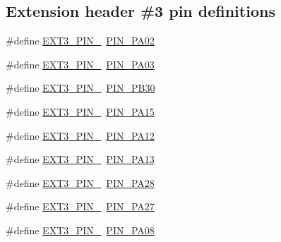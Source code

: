 \subsection*{Extension header \#3 pin definitions}
\begin{DoxyCompactItemize}
\item 
\#define \mbox{\hyperlink{group__samd21__xplained__pro__features__group_ga8e823d76e968e9463aa7ed9d681ab4c5}{E\+X\+T3\+\_\+\+P\+I\+N\+\_}}~\mbox{\hyperlink{pio_2samd21j18a_8h_ada4a90557e056a63a5c13b11343471ab}{P\+I\+N\+\_\+\+P\+A02}}
\item 
\#define \mbox{\hyperlink{group__samd21__xplained__pro__features__group_ga2659ebbdbb6a69bacfb06d0c5e076686}{E\+X\+T3\+\_\+\+P\+I\+N\+\_}}~\mbox{\hyperlink{pio_2samd21j18a_8h_a32b9f520e39b943f78a864645721a9d6}{P\+I\+N\+\_\+\+P\+A03}}
\item 
\#define \mbox{\hyperlink{group__samd21__xplained__pro__features__group_gae0e882567ba8d8b65d6f02ce1c8e197b}{E\+X\+T3\+\_\+\+P\+I\+N\+\_}}~\mbox{\hyperlink{pio_2samd21j18a_8h_a5ff751a11f710f459e0ccb12b6db3e29}{P\+I\+N\+\_\+\+P\+B30}}
\item 
\#define \mbox{\hyperlink{group__samd21__xplained__pro__features__group_gae585af12e54a482a9c0b560088f49961}{E\+X\+T3\+\_\+\+P\+I\+N\+\_}}~\mbox{\hyperlink{pio_2samd21j18a_8h_abaad308f0408bf5d3f1fe558f3d26e5e}{P\+I\+N\+\_\+\+P\+A15}}
\item 
\#define \mbox{\hyperlink{group__samd21__xplained__pro__features__group_ga9da5b6d042c1319ae248f3edc093cd82}{E\+X\+T3\+\_\+\+P\+I\+N\+\_}}~\mbox{\hyperlink{pio_2samd21j18a_8h_a2ffb0dfd383bdc2f6e8f41a9ef0d4955}{P\+I\+N\+\_\+\+P\+A12}}
\item 
\#define \mbox{\hyperlink{group__samd21__xplained__pro__features__group_gac33c7a96afb4b0a7be81fd0a4a3eb353}{E\+X\+T3\+\_\+\+P\+I\+N\+\_}}~\mbox{\hyperlink{pio_2samd21j18a_8h_a4180bdc6fd7252cff2ffe28176866028}{P\+I\+N\+\_\+\+P\+A13}}
\item 
\#define \mbox{\hyperlink{group__samd21__xplained__pro__features__group_ga4d3e99570736508ef7b8160dd9147959}{E\+X\+T3\+\_\+\+P\+I\+N\+\_}}~\mbox{\hyperlink{pio_2samd21j18a_8h_af75c65abdba3e908699ed3c1c21f1148}{P\+I\+N\+\_\+\+P\+A28}}
\item 
\#define \mbox{\hyperlink{group__samd21__xplained__pro__features__group_ga4724c7144bc67a5615924e8c118d1831}{E\+X\+T3\+\_\+\+P\+I\+N\+\_}}~\mbox{\hyperlink{pio_2samd21j18a_8h_a3794cc9242203d349103ba1249e5d587}{P\+I\+N\+\_\+\+P\+A27}}
\item 
\#define \mbox{\hyperlink{group__samd21__xplained__pro__features__group_ga3ff8ac1a1d17200f4cc8ca790dfb3f06}{E\+X\+T3\+\_\+\+P\+I\+N\+\_}}~\mbox{\hyperlink{pio_2samd21j18a_8h_a7dc08bf81d9967156de18aae2cb5fe46}{P\+I\+N\+\_\+\+P\+A08}}

\end{DoxyCompactItemize}
